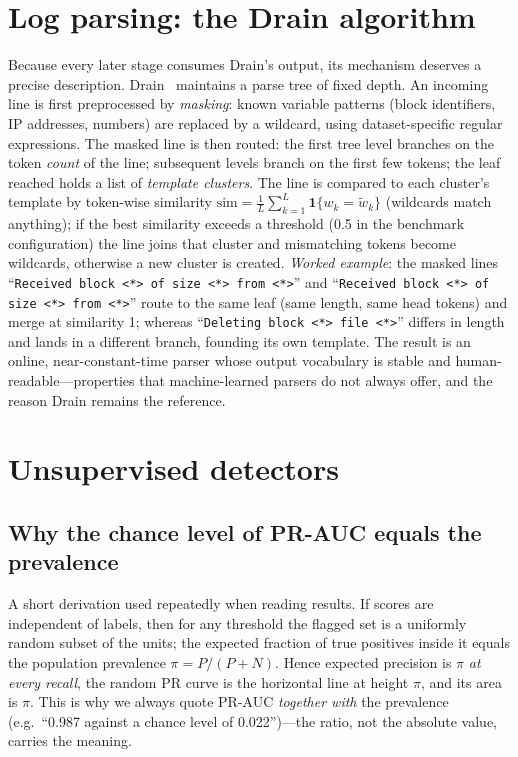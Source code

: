 \documentclass[11pt,a4paper]{report}
\newcommand{\code}[1]{\texttt{\small #1}}
\begin{document}
\section{Log parsing: the Drain algorithm}
\label{sec:theory-drain}
Because every later stage consumes Drain's output, its mechanism deserves a
precise description. Drain~\cite{drain} maintains a parse tree of fixed
depth. An incoming line is first preprocessed by \emph{masking}: known
variable patterns (block identifiers, IP addresses, numbers) are replaced by
a wildcard, using dataset-specific regular expressions. The masked line is
then routed: the first tree level branches on the token \emph{count} of the
line; subsequent levels branch on the first few tokens; the leaf reached
holds a list of \emph{template clusters}. The line is compared to each
cluster's template by token-wise similarity
$\mathrm{sim}=\frac{1}{L}\sum_{k=1}^{L}\mathbf{1}\{w_k=\tilde w_k\}$
(wildcards match anything); if the best similarity exceeds a threshold
(0.5 in the benchmark configuration) the line joins that cluster and
mismatching tokens become wildcards, otherwise a new cluster is created.
\emph{Worked example}: the masked lines
``\code{Received block <*> of size <*> from <*>}'' and
``\code{Received block <*> of size <*> from <*>}'' route to the same leaf
(same length, same head tokens) and merge at similarity 1; whereas
``\code{Deleting block <*> file <*>}'' differs in length and lands in a
different branch, founding its own template. The result is an online,
near-constant-time parser whose output vocabulary is stable and
human-readable---properties that machine-learned parsers do not always
offer, and the reason Drain remains the reference.

\section{Unsupervised detectors}
\label{sec:theory-detectors}

\subsection{Why the chance level of PR-AUC equals the prevalence}
A short derivation used repeatedly when reading results. If scores are
independent of labels, then for any threshold the flagged set is a uniformly
random subset of the units; the expected fraction of true positives inside
it equals the population prevalence $\pi=P/(P{+}N)$. Hence expected
precision is $\pi$ \emph{at every recall}, the random PR curve is the
horizontal line at height $\pi$, and its area is $\pi$. This is why we
always quote PR-AUC \emph{together with} the prevalence (e.g.\ ``0.987
against a chance level of 0.022'')---the ratio, not the absolute value,
carries the meaning.
\end{document}
